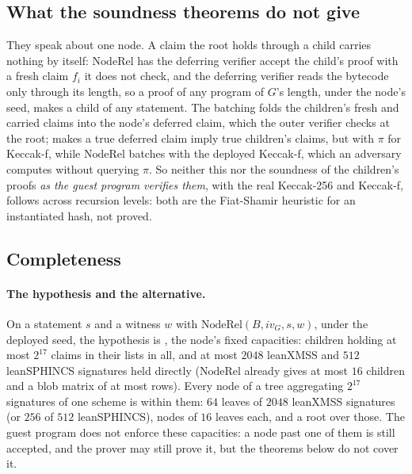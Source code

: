\documentclass[11pt]{article}
\begin{document}
\subsection{What the soundness theorems do not give}\label{sec:notgive}

They speak about one node. A claim the root holds through a child carries nothing by itself: $\mathrm{NodeRel}$ has the deferring verifier accept the child's proof with a fresh claim $f_i$ it does not check, and the deferring verifier reads the bytecode only through its length, so a proof of any program of $G$'s length, under the node's seed, makes a child of any statement. The batching folds the children's fresh and carried claims into the node's deferred claim, which the outer verifier checks at the root;  makes a true deferred claim imply true children's claims, but with $\pi$ for Keccak-f, while $\mathrm{NodeRel}$ batches with the deployed Keccak-f, which an adversary computes without querying $\pi$. So neither this nor the soundness of the children's proofs \emph{as the guest program verifies them}, with the real Keccak-256 and Keccak-f, follows across recursion levels: both are the Fiat-Shamir heuristic for an instantiated hash, not proved.

\subsection{Completeness}

\paragraph{The hypothesis and the alternative.} On a statement $s$ and a witness $w$ with $\mathrm{NodeRel}(B, iv_G, s, w)$, under the deployed seed, the hypothesis is , the node's fixed capacities: children holding at most $2^{17}$ claims in their lists in all, and at most $2048$ leanXMSS and $512$ leanSPHINCS signatures held directly ($\mathrm{NodeRel}$ already gives at most $16$ children and a blob matrix of at most  rows). Every node of a tree aggregating $2^{17}$ signatures of one scheme is within them: $64$ leaves of $2048$ leanXMSS signatures (or $256$ of $512$ leanSPHINCS), nodes of $16$ leaves each, and a root over those. The guest program does not enforce these capacities: a node past one of them is still accepted, and the prover may still prove it, but the theorems below do not cover it.
\end{document}
